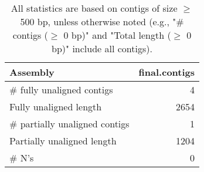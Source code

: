 \documentclass[12pt,a4paper]{article}
\begin{document}
\begin{table}[ht]
\begin{center}
\caption{All statistics are based on contigs of size $\geq$ 500 bp, unless otherwise noted (e.g., "\# contigs ($\geq$ 0 bp)" and "Total length ($\geq$ 0 bp)" include all contigs).}
\begin{tabular}{|l*{1}{|r}|}
\hline
Assembly & final.contigs \\ \hline
\# fully unaligned contigs & 4 \\ \hline
Fully unaligned length & 2654 \\ \hline
\# partially unaligned contigs & 1 \\ \hline
Partially unaligned length & 1204 \\ \hline
\# N's & 0 \\ \hline
\end{tabular}
\end{center}
\end{table}
\end{document}
